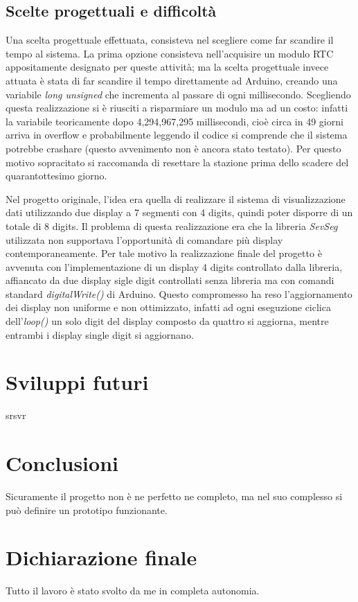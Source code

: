 \documentclass[paper=a4, fontsize=10pt]{scrartcl}
\begin{document}
\subsection{Scelte progettuali e difficoltà}
Una scelta progettuale effettuata, consisteva nel scegliere come far scandire il tempo al sistema.
La prima opzione consisteva nell'acquisire un modulo RTC appositamente designato per queste attività; ma la scelta progettuale invece attuata è stata di far scandire il tempo direttamente ad Arduino, creando una variabile \textit{long unsigned} che incrementa al passare di ogni millisecondo. Scegliendo questa realizzazione si è riusciti a risparmiare un modulo ma ad un costo: infatti la variabile teoricamente dopo 4,294,967,295 millisecondi, cioè circa in 49 giorni arriva in overflow e probabilmente leggendo il codice si comprende che il sistema potrebbe crashare (questo avvenimento non è ancora stato testato). Per questo motivo sopracitato si raccomanda di resettare la stazione prima dello scadere del quarantottesimo giorno.

Nel progetto originale, l'idea era quella di realizzare il sistema di visualizzazione dati utilizzando due display a 7 segmenti con 4 digits, quindi poter disporre di un totale di 8 digits. Il problema di questa realizzazione era che la libreria \textit{SevSeg} utilizzata non supportava l'opportunità di comandare più display contemporaneamente. Per tale motivo la realizzazione finale del progetto è avvenuta con l'implementazione di un display 4 digits controllato dalla libreria, affiancato da due display sigle digit controllati senza libreria ma con comandi standard \textit{digitalWrite()} di Arduino. Questo compromesso ha reso l'aggiornamento dei display non uniforme e non ottimizzato, infatti ad ogni eseguzione ciclica dell'\textit{loop()} un solo digit del display composto da quattro si aggiorna, mentre entrambi i display single digit si aggiornano.


\section{Sviluppi futuri}
srsvr

\section{Conclusioni}
Sicuramente il progetto non è ne perfetto ne completo, ma nel suo complesso si può definire un prototipo funzionante.

\section{Dichiarazione finale}
Tutto il lavoro è stato svolto da me in completa autonomia.
\end{document}
